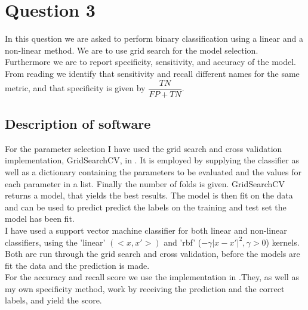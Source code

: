 \section{Question 3}
In this question we are asked to perform binary classification using a linear and a non-linear method. We are to use grid search for the model selection. Furthermore we are to report specificity, sensitivity, and accuracy of the model.\\
From reading \cite{senspec} we identify that sensitivity and recall different names for the same metric, and that specificity is given by \(\dfrac{TN}{FP+TN}\).

\subsection{Description of software}\label{classification}
For the parameter selection I have used the grid search and cross validation implementation, GridSearchCV, in \cite{scikit-learn}. It is employed by supplying the classifier as well as a dictionary containing the parameters to be evaluated and the values for each parameter in a list. Finally the number of folds is given. GridSearchCV returns a model, that yields the best results. The model is then fit on the data and can be used to predict predict the labels on the training and test set the model has been fit.\\
I have used a support vector machine classifier for both linear and non-linear classifiers, using the 'linear' \((<x,x'>)\) and 'rbf' (\(-\gamma|x-x'|^2, \gamma > 0\)) kernels. Both are run through the grid search and cross validation, before the models are fit the data and the prediction is made.\\
For the accuracy and recall score we use the implementation in \cite{scikit-learn}.They, as well as my own specificity method, work by receiving the prediction and the correct labels, and yield the score.

